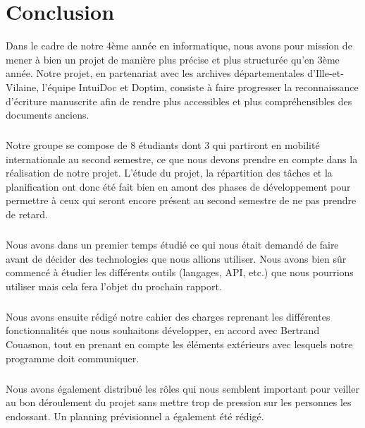 \chapter{Conclusion}

Dans le cadre de notre 4ème année en informatique, nous avons pour mission de
mener à bien un projet de manière plus précise et plus structurée qu’en 3ème année.
Notre projet, en partenariat avec les archives départementales d’Ille-et-Vilaine,
l’équipe IntuiDoc et Doptim, consiste à faire progresser la reconnaissance d’écriture
manuscrite afin de rendre plus accessibles et plus compréhensibles des documents anciens.

\paragraph{}
Notre groupe se compose de 8 étudiants dont 3 qui partiront en mobilité internationale
au second semestre, ce que nous devons prendre en compte dans la réalisation de notre
projet. L’étude du projet, la répartition des tâches et la planification ont donc été
fait bien en amont des phases de développement pour permettre à ceux qui seront encore
présent au second semestre de ne pas prendre de retard.

\paragraph{}
Nous avons dans un premier temps étudié ce qui nous était demandé de faire avant de
décider des technologies que nous allions utiliser. Nous avons bien sûr commencé à
étudier les différents outils (langages, API, etc.) que nous pourrions utiliser mais
cela fera l’objet du prochain rapport.

\paragraph{}
Nous avons ensuite rédigé notre cahier des charges reprenant les différentes fonctionnalités
que nous souhaitons développer, en accord avec Bertrand Couasnon, tout en prenant en compte
les éléments extérieurs avec lesquels notre programme doit communiquer.

\paragraph{}
Nous avons également distribué les rôles qui nous semblent important pour veiller au bon
déroulement du projet sans mettre trop de pression sur les personnes les endossant.
Un planning prévisionnel a également été rédigé.